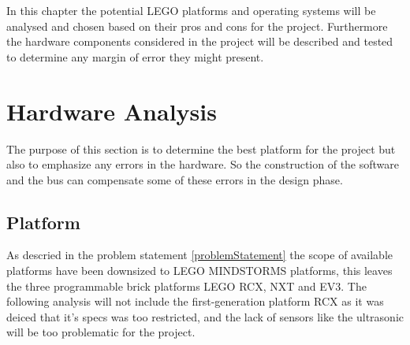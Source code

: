 In this chapter the potential LEGO platforms and operating systems will be analysed and chosen based on their pros and cons for the project. Furthermore the hardware components considered in the project will be described and tested to determine any margin of error they might present.  






\section{Hardware Analysis}
The purpose of this section is to determine the best platform for the project but also to emphasize any errors in the hardware. So the construction of the software and the bus can compensate some of these errors in the design phase. 





\subsection{Platform} \label{hardwareplatform}
As descried in the problem statement \ref{problemStatement} the scope of available platforms have been downsized to LEGO MINDSTORMS platforms, this leaves the three programmable brick platforms LEGO RCX, NXT and EV3\cite{legoRoboticsHistory}. The following analysis will not include the first-generation platform RCX as it was deiced that it's specs was too restricted, and the lack of sensors like the ultrasonic will be too problematic for the project.

